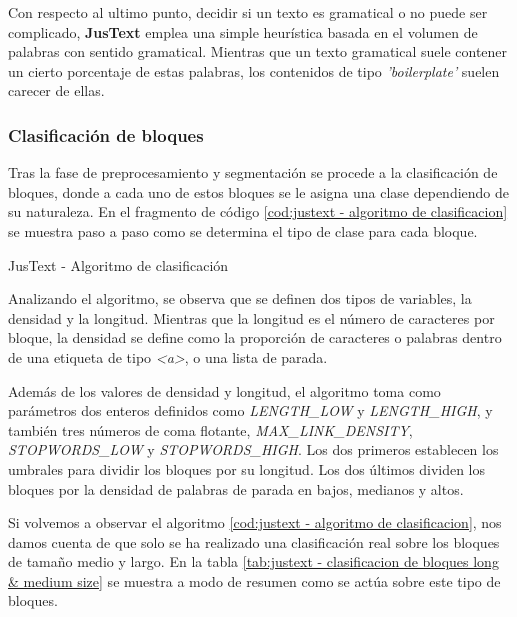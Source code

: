 Con respecto al ultimo punto, decidir si un texto es gramatical o no puede ser complicado, \textbf{JusText} 
emplea una simple heurística basada en el volumen de palabras con sentido gramatical. Mientras que un texto 
gramatical suele contener un cierto porcentaje de estas palabras, los contenidos de tipo \emph{'boilerplate'} 
suelen carecer de ellas.

\subsubsection{Clasificación de bloques}
\label{subsubsec:clasificacion de bloques}

Tras la fase de preprocesamiento y segmentación se procede a la clasificación de bloques, donde a cada uno
de estos bloques se le asigna una clase dependiendo de su naturaleza. En el fragmento de código 
\ref{cod:justext - algoritmo de clasificacion} se muestra paso a paso como se determina el tipo de clase 
para cada bloque.

\begin{codefloat}
  
  \caption{JusText - Algoritmo de clasificación}
  \label{cod:justext - algoritmo de clasificacion}
\end{codefloat}

Analizando el algoritmo, se observa que se definen dos tipos de variables, la densidad y la longitud. 
Mientras que la longitud es el número de caracteres por bloque, la densidad se define como la proporción 
de caracteres o palabras dentro de una etiqueta de tipo \emph{<a>}, o una lista de parada.

Además de los valores de densidad y longitud, el algoritmo toma como parámetros dos enteros definidos como
\emph{LENGTH\_LOW} y \emph{LENGTH\_HIGH}, y también tres números de coma flotante, \emph{MAX\_LINK\_DENSITY},
\emph{STOPWORDS\_LOW} y \emph{STOPWORDS\_HIGH}. Los dos primeros establecen los umbrales para dividir los 
bloques por su longitud. Los dos últimos dividen los bloques por la densidad de palabras de parada en bajos, 
medianos y altos.

Si volvemos a observar el algoritmo \ref{cod:justext - algoritmo de clasificacion}, nos damos cuenta de
que solo se ha realizado una clasificación real sobre los bloques de tamaño medio y largo. En la tabla
\ref{tab:justext - clasificacion de bloques long & medium size} se muestra a modo de resumen como se actúa 
sobre este tipo de bloques.

